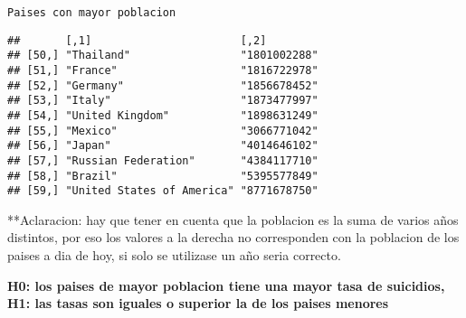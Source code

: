\documentclass[]{article}
\newenvironment{Shaded}{\begin{snugshade}}{\end{snugshade}}
\newcommand{\KeywordTok}[1]{\textcolor[rgb]{0.13,0.29,0.53}{\textbf{#1}}}
\newcommand{\DataTypeTok}[1]{\textcolor[rgb]{0.13,0.29,0.53}{#1}}
\newcommand{\DecValTok}[1]{\textcolor[rgb]{0.00,0.00,0.81}{#1}}
\newcommand{\FloatTok}[1]{\textcolor[rgb]{0.00,0.00,0.81}{#1}}
\newcommand{\StringTok}[1]{\textcolor[rgb]{0.31,0.60,0.02}{#1}}
\newcommand{\CommentTok}[1]{\textcolor[rgb]{0.56,0.35,0.01}{\textit{#1}}}
\newcommand{\OperatorTok}[1]{\textcolor[rgb]{0.81,0.36,0.00}{\textbf{#1}}}
\newcommand{\NormalTok}[1]{#1}
\begin{document}
\begin{verbatim}
Paises con mayor poblacion
\end{verbatim}

\begin{Shaded}
\end{Shaded}

\begin{verbatim}
##       [,1]                       [,2]        
## [50,] "Thailand"                 "1801002288"
## [51,] "France"                   "1816722978"
## [52,] "Germany"                  "1856678452"
## [53,] "Italy"                    "1873477997"
## [54,] "United Kingdom"           "1898631249"
## [55,] "Mexico"                   "3066771042"
## [56,] "Japan"                    "4014646102"
## [57,] "Russian Federation"       "4384117710"
## [58,] "Brazil"                   "5395577849"
## [59,] "United States of America" "8771678750"
\end{verbatim}

**Aclaracion: hay que tener en cuenta que la poblacion es la suma de
varios años distintos, por eso los valores a la derecha no corresponden
con la poblacion de los paises a dia de hoy, si solo se utilizase un año
seria correcto.

\textbf{H0: los paises de mayor poblacion tiene una mayor tasa de
suicidios, H1: las tasas son iguales o superior la de los paises
menores}

\begin{Shaded}
\end{Shaded}
\end{document}
